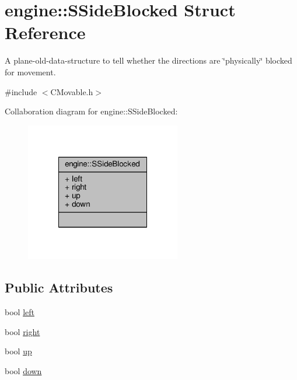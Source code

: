 \hypertarget{structengine_1_1SSideBlocked}{\section{engine\-:\-:S\-Side\-Blocked Struct Reference}
\label{structengine_1_1SSideBlocked}
}


A plane-\/old-\/data-\/structure to tell whether the directions are \char`\"{}physically\char`\"{} blocked for movement.  




{\ttfamily \#include $<$C\-Movable.\-h$>$}



Collaboration diagram for engine\-:\-:S\-Side\-Blocked\-:
\nopagebreak
\begin{figure}[H]
\begin{center}
\leavevmode
\includegraphics[width=192pt]{structengine_1_1SSideBlocked__coll__graph}
\end{center}
\end{figure}
\subsection*{Public Attributes}
\begin{DoxyCompactItemize}
\item 
bool \hyperlink{structengine_1_1SSideBlocked_aab2ebe596bade5dd2111290ff4171268}{left}
\item 
bool \hyperlink{structengine_1_1SSideBlocked_af6f555a50cd295e753bc57ba1fe98b7b}{right}
\item 
bool \hyperlink{structengine_1_1SSideBlocked_a62f8b294229bf0f52bc01ffcc9086202}{up}
\item 
bool \hyperlink{structengine_1_1SSideBlocked_ab0a5ec3de4a3a1f71eb8c28dcaa113ec}{down}
\end{DoxyCompactItemize}


